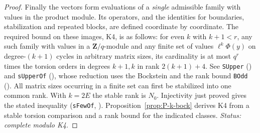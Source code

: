 \begin{proof}
Finally the vectors form evaluations of a \emph{single} admissible
family with values in the product module. Its operators, and the
identities for boundaries, stabilization and repeated blocks, are
defined coordinate by coordinate. The required bound on these images, K4, is as follows: for even $k$
with $k+1<r$, any such family with values in a $\mathbf Z/q$-module and
any finite set of values $\ell^k\Phi(y)$ on degree-$(k+1)$ cycles in
arbitrary matrix sizes, its cardinality is at most
$q^r$ times the torsion orders in degrees $k+1,k$ in rank
$2(k+1)+4$. See \nolinkurl{SUpper}
() and \nolinkurl{sUpperOf}
(), whose reduction uses the Bockstein and
the rank bound \nolinkurl{BOdd} ().
All matrix sizes occurring in a finite set can first be stabilized into
one common rank. With $k=2E$ the stable rank is $N_0$. Injectivity just
proved gives the stated inequality (\nolinkurl{sFewOf},
).
Proposition~\ref{prop:P-k-bock} derives K4 from a stable torsion comparison and a rank bound for the indicated classes. \emph{Status: complete modulo K4.}
\end{proof}

